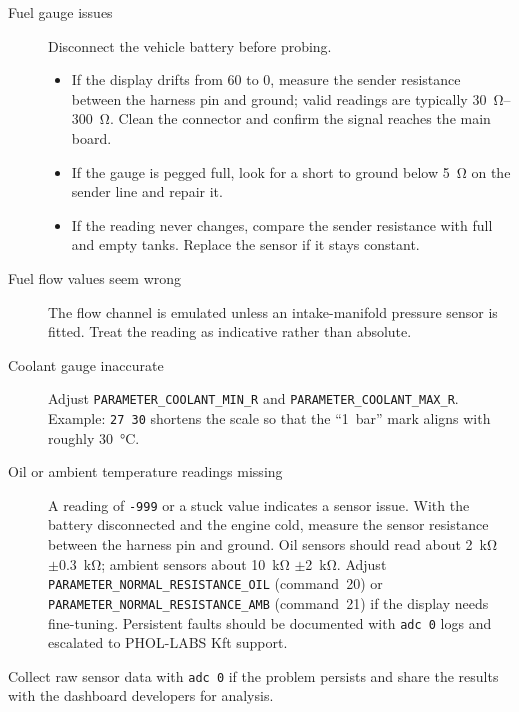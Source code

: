 \begin{description}
    \item[Fuel gauge issues] Disconnect the vehicle battery before probing.\begin{itemize}
        \item If the display drifts from 60 to 0, measure the sender resistance between the harness pin and ground; valid readings are typically \SIrange{30}{300}{\ohm}. Clean the connector and confirm the signal reaches the main board.
        \item If the gauge is pegged full, look for a short to ground below \SI{5}{\ohm} on the sender line and repair it.
        \item If the reading never changes, compare the sender resistance with full and empty tanks. Replace the sensor if it stays constant.
    \end{itemize}
    \item[Fuel flow values seem wrong] The flow channel is emulated unless an intake-manifold pressure sensor is fitted. Treat the reading as indicative rather than absolute.
    \item[Coolant gauge inaccurate] Adjust \texttt{PARAMETER\_COOLANT\_MIN\_R} and \texttt{PARAMETER\_COOLANT\_MAX\_R}. Example: \verb|27 30| shortens the scale so that the ``1~bar'' mark aligns with roughly \SI{30}{\celsius}.
    \item[Oil or ambient temperature readings missing] A reading of \texttt{-999} or a stuck value indicates a sensor issue. With the battery disconnected and the engine cold, measure the sensor resistance between the harness pin and ground. Oil sensors should read about \SI{2}{\kilo\ohm} \ensuremath{\pm}\SI{0.3}{\kilo\ohm}; ambient sensors about \SI{10}{\kilo\ohm} \ensuremath{\pm}\SI{2}{\kilo\ohm}. Adjust \texttt{PARAMETER\_NORMAL\_RESISTANCE\_OIL} (command~20) or \texttt{PARAMETER\_NORMAL\_RESISTANCE\_AMB} (command~21) if the display needs fine-tuning. Persistent faults should be documented with \verb|adc 0| logs and escalated to PHOL-LABS Kft support.
\end{description}

Collect raw sensor data with \verb|adc 0| if the problem persists and share the results with the dashboard developers for analysis.
